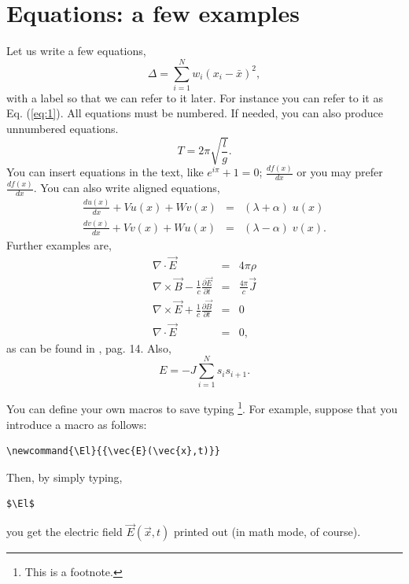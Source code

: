 \documentclass[twocolumn]{revtex4}
\begin{document}
\section{Equations: a few examples}
Let us write a few equations,
\begin{equation}
\Delta =\sum_{i=1}^N w_i (x_i - \bar{x})^2,
\label{eq:1}
\end{equation}
with a label so that we can refer to it later. For instance you can refer
to it as Eq. (\ref{eq:1}).
All equations must be numbered.
If needed, you can also produce unnumbered equations.
\begin{equation}
T = 2 \pi \sqrt{\frac{l}{g}}. \nonumber
\end{equation}
You can insert equations in the text, like $e^{i \pi} +1=0$;
$\frac{df(x)}{dx}$ or you may prefer
$\displaystyle \frac{df(x)}{dx}$.
You can also write aligned equations,
\begin{eqnarray}
\frac{du(x)}{dx}+V u(x) +W v(x) &=& (\lambda + \alpha)  \; u(x) \nonumber \\
\frac{dv(x)}{dx}+V v(x) +W u(x) &=& (\lambda - \alpha) \; v(x).
\label{eq:tercera}\end{eqnarray}
Further examples are,
\begin{eqnarray}
\nabla {\cdot} \vec{E}&=& 4 \pi \rho \nonumber \\
\nabla \times \vec{B} - \frac{1}{c} \frac{\partial \vec{E}}{\partial t} &=&
\frac{4 \pi}{c} \vec{J} \nonumber \\
\nabla \times \vec{E} +\frac{1}{c} \frac{\partial \vec{B}}{\partial t} &=&
0 \nonumber \\
\nabla {\cdot} \vec{E}&=& 0,
\label{maxwell}
\end{eqnarray}
as can be found in \cite{jackson}, pag. 14. Also,
\begin{equation}
E = -J \sum_{i=1}^N s_i s_{i+1}.
\label{eq:ising}
\end{equation}

You can define your own macros to save typing
\footnote{This is a footnote.}.
For example, suppose
that you introduce a macro as follows:
\newcommand{\El}{{\vec{E}(\vec{x},t)}}
\begin{verbatim}
\newcommand{\El}{{\vec{E}(\vec{x},t)}}
\end{verbatim}
Then, by simply typing,
\begin{verbatim}
$\El$
\end{verbatim}
you get the electric field $\El$ printed out (in math mode, of course).
\end{document}
